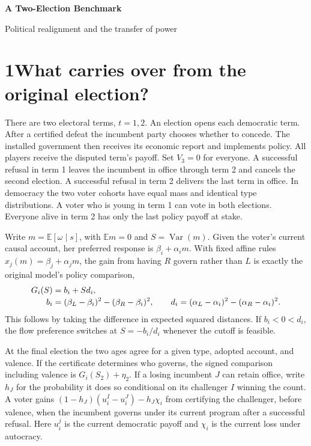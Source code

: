 \documentclass[11pt,letterpaper]{article}
\newcommand{\E}{\mathbb E}\newcommand{\Var}{\operatorname{Var}}\newcommand{\UU}{\mathsf U}
\begin{document}
\thispagestyle{plain}
{\LARGE\bfseries A Two-Election Benchmark\par}
{\large Political realignment and the transfer of power\par}
\vspace{3pt}
\section*{1\quad What carries over from the original election?}
There are two electoral terms, \(t=1,2\). An election opens each democratic term. After a certified defeat the incumbent party chooses whether to concede. The installed government then receives its economic report and implements policy. All players receive the disputed term's payoff. Set \(V_3=0\) for everyone. A successful refusal in term 1 leaves the incumbent in office through term 2 and cancels the second election. A successful refusal in term 2 delivers the last term in office. In democracy the two voter cohorts have equal mass and identical type distributions. A voter who is young in term 1 can vote in both elections. Everyone alive in term 2 has only the last policy payoff at stake.

Write \(m=\E[\omega\mid s]\), with \(\E m=0\) and \(S=\Var(m)\). Given the voter's current causal account, her preferred response is \(\beta_i+\alpha_i m\). With fixed affine rules \(x_j(m)=\beta_j+\alpha_jm\), the gain from having \(R\) govern rather than \(L\) is exactly the original model's policy comparison,
\begin{align}
 G_i(S)&=b_i+S d_i,\label{eq:flow}\\[-2pt]
 b_i&=(\beta_L-\beta_i)^2-(\beta_R-\beta_i)^2,\qquad
 d_i=(\alpha_L-\alpha_i)^2-(\alpha_R-\alpha_i)^2.\notag
\end{align}
This follows by taking the difference in expected squared distances. If \(b_i<0<d_i\), the flow preference switches at \(S=-b_i/d_i\) whenever the cutoff is feasible.

At the final election the two ages agree for a given type, adopted account, and valence. If the certificate determines who governs, the signed comparison including valence is \(G_i(S_2)+\eta_2\). If a losing incumbent \(J\) can retain office, write \(h_J\) for the probability it does so conditional on its challenger \(I\) winning the count. A voter gains \((1-h_J)(u_i^I-u_i^J)-h_J\chi_i\) from certifying the challenger, before valence, when the incumbent governs under its current program after a successful refusal. Here \(u_i^j\) is the current democratic payoff and \(\chi_i\) is the current loss under autocracy.
\end{document}
